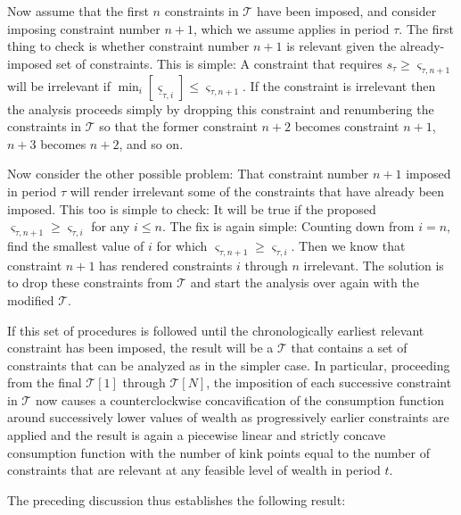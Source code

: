 \documentclass[titlepage]{\econtex}
\providecommand{\sConst}{\varsigma}
\begin{document}
Now assume that the first $n$ constraints in $\mathcal{T}$
have been imposed, and consider imposing constraint number $n+1$,
which we assume applies in period $\tau$.  The first thing to check is
whether constraint number $n+1$ is relevant given the already-imposed
set of constraints.  This is simple: A constraint that requires
$s_{\tau} \geq \sConst_{\tau,n+1}$ will be irrelevant if $\min_{i}
[\underline{\sConst}_{\tau,i}] \leq \sConst_{\tau,n+1}$.  If the
constraint is irrelevant then the analysis proceeds simply by dropping
this constraint and renumbering the constraints in
$\mathcal{T}$ so that the former constraint $n+2$ becomes
constraint $n+1$, $n+3$ becomes $n+2$, and so on.

Now consider the other possible problem: That constraint number $n+1$
imposed in period $\tau$ will render irrelevant some of the
constraints that have already been imposed.  This too is simple to
check: It will be true if the proposed $\sConst_{\tau,n+1} \geq
\sConst_{\tau,i}$ for any $i \leq n$.  The fix is again simple:
Counting down from $i=n$, find the smallest value of $i$ for which
$\sConst_{\tau,n+1} \geq \sConst_{\tau,i}$.  Then we know that
constraint $n+1$ has rendered constraints $i$ through $n$ irrelevant.
The solution is to drop these constraints from $\mathcal{T}$
and start the analysis over again with the modified
$\mathcal{T}$.

If this set of procedures is followed until the chronologically
earliest relevant constraint has been imposed, the result will be a
$\mathcal{T}$ that contains a set of constraints that can be
analyzed as in the simpler case.  In particular, proceeding from the
final $\mathcal{T}[1]$ through $\mathcal{T}[N]$, the imposition of each successive
constraint in $\mathcal{T}$ now causes a counterclockwise
concavification of the consumption function around successively lower
values of wealth as progressively earlier constraints are applied and
the result is again a piecewise linear and strictly concave consumption function with the number of kink points equal to the number of constraints that are relevant at any feasible level of wealth in period $t$.

The preceding discussion thus establishes the following result:
\end{document}
